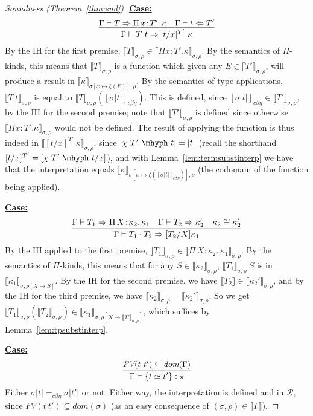 \documentclass{article}
\newcommand{\choice}[0]{\zeta}
\newcommand{\abs}[4]{{#1}\, #2\! : \! #3.\, #4}
\newcommand{\interp}[1]{\llbracket #1 \rrbracket}
\newcommand{\tpcheck}[0]{\Leftarrow}
\newcommand{\tpsynth}[0]{\Rightarrow}
\newcommand{\cbe}[0]{c\beta\eta}
\newcommand{\startcase}[1]{\vspace{#1} \noindent\textbf{\underline{Case:}}}
\begin{document}
\begin{proof}[Soundness (Theorem~\ref{thm:snd})]
\startcase{.2cm}
\[
   \infer{\Gamma\vdash T\ t \tpsynth [t/x]^{T'}\ \kappa}{\Gamma\vdash T \tpsynth
     \abs{\Pi}{x}{T'}{\kappa} & \Gamma\vdash t \tpcheck T'}  
\]
By the IH for the first premise,
$\interp{T}_{\sigma,\rho}\in\interp{\Pi x:T'.\kappa}_{\sigma,\rho}$.
By the semantics of $\Pi$-kinds, this means that
$\interp{T}_{\sigma,\rho}$ is a function which given any
$E\in\interp{T'}_{\sigma,\rho}$, will produce a result in
$\interp{\kappa}_{\sigma[x\mapsto \choice(E)],\rho}$.  By the
semantics of type applications, $\interp{T\ t}_{\sigma,\rho}$ is equal
to $\interp{T}_{\sigma,\rho}([\sigma |t|]_{\cbe})$.  This is defined,
since $[\sigma |t|]_{\cbe}\in\interp{T'}_{\sigma,\rho}$, by the IH for
the second premise; note that $\interp{T'}_{\sigma,\rho}$ is defined
since otherwise $\interp{\Pi x:T'.\kappa}_{\sigma,\rho}$ would not be defined.
The result of applying the function is thus indeed
in $\interp{[t/x]^{T'}\ \kappa}_{\sigma,\rho}$, since \(|\chi\ T'\ \mhyph\ t| =
|t|\) (recall the shorthand \([t/x]^{T'} = [\chi\ T'\ \mhyph\ t/x]\)), and with  
Lemma~\ref{lem:termsubstinterp} we have that the interpretation equals
$\interp{\kappa}_{\sigma[x\mapsto \choice([\sigma |t|]_{\cbe})],\rho}$
(the codomain of the function being applied).

\startcase{.2cm}
\[
  \infer{\Gamma\vdash T_1 \cdot T_2 \tpsynth [T_2/X]\kappa_1}{\Gamma\vdash T_1 \tpsynth \abs{\Pi}{X}{\kappa_2}{\kappa_1} & \Gamma\vdash T_2 \tpsynth \kappa_2' & \kappa_2 \cong \kappa_2'}
\]
By the IH applied to the first premise,
$\interp{T_1}_{\sigma,\rho}\in\interp{\abs{\Pi}{X}{\kappa_2}{\kappa_1}}_{\sigma,\rho}$.
By the semantics of $\Pi$-kinds, this means that for any
$S\in\interp{\kappa_2}_{\sigma,\rho}$, $\interp{T_1}_{\sigma,\rho}\ S$ is in
$\interp{\kappa_1}_{\sigma,\rho[X\mapsto S]}$.  By the IH for the second premise, we have 
$\interp{T_2} \in \interp{\kappa_2'}_{\sigma,\rho}$, and by the IH for the third premise,
we have $\interp{\kappa_2}_{\sigma,\rho} = \interp{\kappa_2'}_{\sigma,\rho}$.  So
we get $\interp{T_1}_{\sigma,\rho}(\interp{T_2}_{\sigma,\rho})\in \interp{\kappa_1}_{\sigma,\rho[X\mapsto \interp{T'}_{\sigma,\rho}]}$,
which suffices by Lemma~\ref{lem:tpsubstinterp}.

\startcase{.2cm}
\[
    \infer{\Gamma\vdash \{ t \simeq t' \} : \star}{\textit{FV}(t\ t')\subseteq\textit{dom}(\Gamma)}
\]
Either $\sigma |t| =_{\cbe} \sigma |t'|$ or not.  Either way, the interpretation is defined and in $\mathcal{R}$, since
$\textit{FV}(t\ t')\subseteq\textit{dom}(\sigma)$ (as an easy consequence of $(\sigma,\rho)\in\interp{\Gamma}$).


\end{proof}
\end{document}
